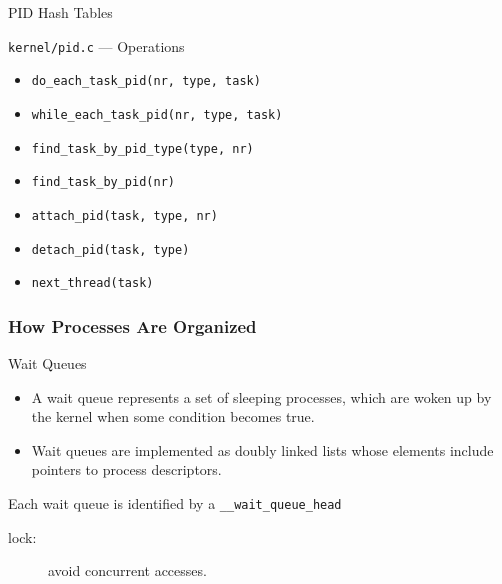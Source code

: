 \begin{frame}{PID Hash Tables}
  \begin{center}
  \end{center}
\end{frame}

\begin{frame}[fragile=singleslide]
  \begin{block}{\texttt{kernel/pid.c} --- Operations}
    \begin{itemize}
    \item \texttt{do_each_task_pid(nr, type, task)}
    \item \texttt{while_each_task_pid(nr, type, task)}
    \item \texttt{find_task_by_pid_type(type, nr)}
    \item \texttt{find_task_by_pid(nr)}
    \item \texttt{attach_pid(task, type, nr)}
    \item \texttt{detach_pid(task, type)}
    \item \texttt{next_thread(task)}
    \end{itemize}
  \end{block}
\end{frame}

\subsubsection{How Processes Are Organized}

\begin{frame}{Wait Queues}
  \begin{itemize}
  \item A wait queue represents a set of sleeping processes, which are woken up by the
    kernel when some condition becomes true.
  \item Wait queues are implemented as doubly linked lists whose elements include pointers
    to process descriptors.
  \end{itemize}
  \begin{block}{Each wait queue is identified by a \texttt{\_\_wait\_queue\_head}}
    \begin{center}
    \end{center}
    \begin{description}
    \item[lock:] avoid concurrent accesses.
    \end{description}
  \end{block}
\end{frame}

